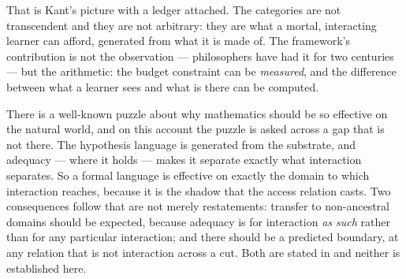 That is Kant's picture with a ledger attached. The categories are not transcendent
and they are not arbitrary: they are what a mortal, interacting learner can afford,
generated from what it is made of. The framework's contribution is not the
observation --- philosophers have had it for two centuries --- but the arithmetic:
the budget constraint can be \emph{measured}, and the difference between what a
learner sees and what is there can be computed.

\begin{remark}
There is a well-known puzzle about why mathematics should be so effective on the
natural world, and on this account the puzzle is asked across a gap that is not
there. The hypothesis language is generated from the substrate, and adequacy ---
where it holds --- makes it separate exactly what interaction separates. So a
formal language is effective on exactly the domain to which interaction reaches,
because it is the shadow that the access relation casts. Two consequences follow
that are not merely restatements: transfer to non-ancestral domains should be
expected, because adequacy is for interaction \emph{as such} rather than for any
particular interaction; and there should be a predicted boundary, at any relation
that is not interaction across a cut. Both are stated in \cite{ScientistNote} and
neither is established here.
\end{remark}
